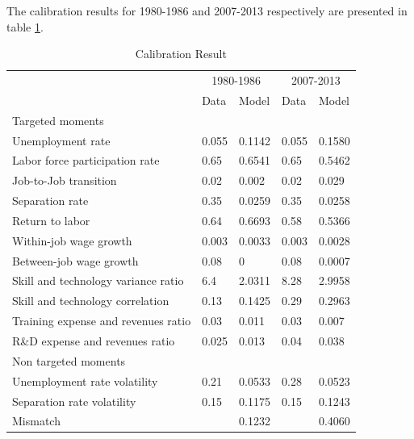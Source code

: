 \documentclass[12pt]{article}
\newcommand{\1}{\mathbb{1}}
\begin{document}
The calibration results for 1980-1986 and 2007-2013 respectively are presented in table \ref{Calibration_Result}. 
\begin{table}[h!]
\centering
\begin{tabular}{l|llll}
\hline \hline
           & \multicolumn{2}{c}{1980-1986}     & \multicolumn{2}{c}{2007-2013}                \\ 
            & Data     &  Model   & Data     &  Model     \\ \hline
Targeted moments  \\
Unemployment rate          & 0.055 & 0.1142 & 0.055 & 0.1580 \\
Labor force participation rate            & 0.65  & 0.6541 & 0.65  & 0.5462 \\
Job-to-Job transition       & 0.02  & 0.002 & 0.02  & 0.029 \\
Separation rate          & 0.35  & 0.0259 & 0.35  & 0.0258 \\
Return to labor        & 0.64  & 0.6693 & 0.58  & 0.5366 \\
Within-job wage growth      & 0.003 & 0.0033 & 0.003 & 0.0028 \\
Between-job wage growth    & 0.08  & 0      & 0.08  & 0.0007      \\
Skill and technology variance ratio          & 6.4   & 2.0311 & 8.28  & 2.9958 \\
Skill and technology correlation        & 0.13  & 0.1425 & 0.29  & 0.2963  \\
Training expense and revenues ratio & 0.03  & 0.011   & 0.03  & 0.007  \\
R\&D expense and revenues ratio  & 0.025 & 0.013  & 0.04  & 0.038 \\
\hline
Non targeted moments                  \\
Unemployment rate volatility          & 0.21  & 0.0533  & 0.28  & 0.0523 \\
Separation rate volatility           & 0.15  & 0.1175 & 0.15  & 0.1243 \\
Mismatch && 0.1232 &&0.4060 \\
\hline 
\end{tabular}
\caption{Calibration Result}
\label{Calibration_Result}
\end{table}
\end{document}
